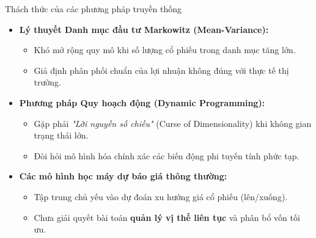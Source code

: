 \documentclass[10pt,aspectratio=169]{beamer}
\begin{document}
\begin{frame}{Thách thức của các phương pháp truyền thống}
  \begin{itemize}
    \item[\color{secondary}\textbf{1.}] \textbf{Lý thuyết Danh mục đầu tư Markowitz (Mean-Variance):}
    \begin{itemize}
      \item Khó mở rộng quy mô khi số lượng cổ phiếu trong danh mục tăng lớn.
      \item Giả định phân phối chuẩn của lợi nhuận không đúng với thực tế thị trường.
    \end{itemize}
    \vspace{0.2cm}
    \item[\color{secondary}\textbf{2.}] \textbf{Phương pháp Quy hoạch động (Dynamic Programming):}
    \begin{itemize}
      \item Gặp phải \textit{"Lời nguyền số chiều"} (Curse of Dimensionality) khi không gian trạng thái lớn.
      \item Đòi hỏi mô hình hóa chính xác các biến động phi tuyến tính phức tạp.
    \end{itemize}
    \vspace{0.2cm}
    \item[\color{secondary}\textbf{3.}] \textbf{Các mô hình học máy dự báo giá thông thường:}
    \begin{itemize}
      \item Tập trung chủ yếu vào dự đoán xu hướng giá cổ phiếu (lên/xuống).
      \item Chưa giải quyết bài toán \textbf{quản lý vị thế liên tục} và phân bổ vốn tối ưu.
    \end{itemize}
  \end{itemize}
\end{frame}
\end{document}
